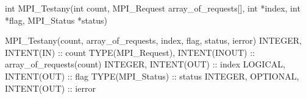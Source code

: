 int MPI_Testany(int count, MPI_Request array_of_requests[],
    int *index, int *flag, MPI_Status *status)

MPI_Testany(count, array_of_requests, index, flag, status, ierror)
INTEGER, INTENT(IN) :: count
TYPE(MPI_Request), INTENT(INOUT) :: array_of_requests(count)
INTEGER, INTENT(OUT) :: index
LOGICAL, INTENT(OUT) :: flag
TYPE(MPI_Status) :: status
INTEGER, OPTIONAL, INTENT(OUT) :: ierror
